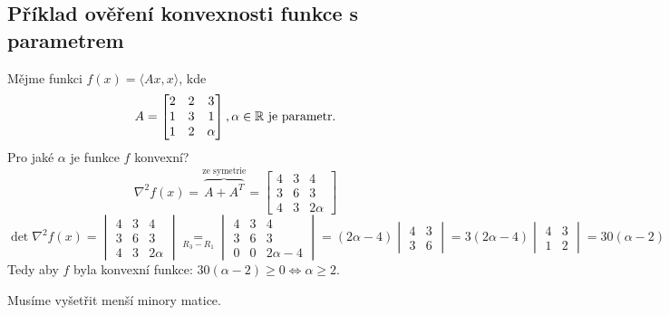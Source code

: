 \subsection{Příklad ověření konvexnosti funkce s parametrem}
Mějme funkci $f(x) = \langle Ax, x\rangle$, kde
\[
A = \begin{bmatrix}
    2 & 2 & 3 \\
    1 & 3 & 1 \\
    1 & 2 & \alpha
\end{bmatrix}, \alpha \in \mathbb{R} \text{ je parametr.}
\]
Pro jaké $\alpha$ je funkce $f$ konvexní?
\[
    \nabla^2 f(x) = \overbrace{A + A^T}^{\text{ze symetrie}} = 
    \begin{bmatrix}
        4 & 3 & 4 \\
        3 & 6 & 3 \\
        4 & 3 & 2 \alpha
    \end{bmatrix}
\]
\[
    \det \nabla^2 f(x) = 
    \begin{vmatrix}
        4 & 3 & 4 \\
        3 & 6 & 3 \\
        4 & 3 & 2 \alpha
    \end{vmatrix} \underset{R_3 - R_1}{=}
    \begin{vmatrix}
        4 & 3 & 4 \\
        3 & 6 & 3 \\
        0 & 0 & 2 \alpha - 4
    \end{vmatrix} = (2 \alpha - 4)
    \begin{vmatrix}
        4 & 3 \\
        3 & 6
    \end{vmatrix} = 3 (2 \alpha - 4)
    \begin{vmatrix}
        4 & 3 \\
        1 & 2 
    \end{vmatrix} = 30 (\alpha - 2)
\]
Tedy aby $f$ byla konvexní funkce: $30 (\alpha - 2) \geq 0 \iff \alpha \geq 2$.

Musíme vyšetřit menší minory matice.

